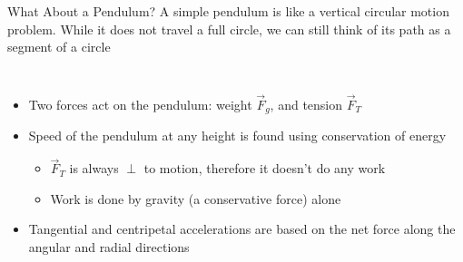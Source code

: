 \documentclass[12pt,compress,aspectratio=169]{beamer}
\begin{document}
\begin{frame}{What About a Pendulum?}
  A simple pendulum is like a vertical circular motion problem. While it does
  not travel a full circle, we can still think of its path as a segment of a
  circle
  \begin{columns}[T]

    \begin{itemize}
    \item Two forces act on the pendulum: weight $\vec F_g$, and
    tension $\vec F_T$
    \item Speed of the pendulum at any height is found using conservation
      of energy
      \begin{itemize}
      \item $\vec F_T$ is always $\perp$ to motion, therefore it doesn't
        do any work
      \item Work is done by gravity (a conservative force) alone
      \end{itemize}
    \item Tangential and centripetal accelerations are based on the net force
      along the angular and radial directions
    \end{itemize}
  \end{columns}
\end{frame}
\end{document}
